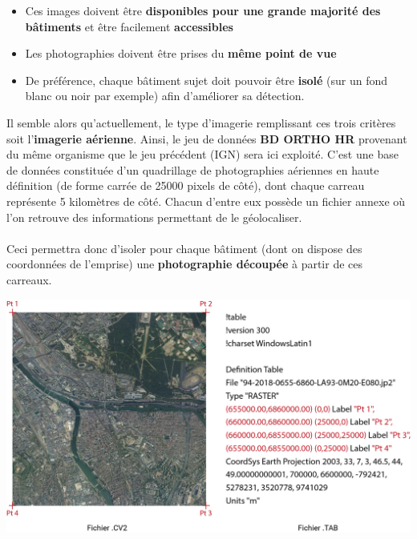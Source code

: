\documentclass[
  11pt,
  french,
]{article}
\newcounter{customfigs}[section]
\newenvironment{customfigs}[1][] {
    \stepcounter{customfigs}
    Fig \arabic{section}. \arabic{customfigs} : }
\newcommand{\masked}{\vspace*{-\baselineskip}}
\begin{document}
\begin{itemize}
\item
  Ces images doivent être \textbf{disponibles pour une grande majorité
  des bâtiments} et être facilement \textbf{accessibles}
\item
  Les photographies doivent être prises du \textbf{même point de vue}
\item
  De préférence, chaque bâtiment sujet doit pouvoir être \textbf{isolé}
  (sur un fond blanc ou noir par exemple) afin d'améliorer sa détection.
\end{itemize}

\hfill\break
Il semble alors qu'actuellement, le type d'imagerie remplissant ces
trois critères soit l'\textbf{imagerie aérienne}. Ainsi, le jeu de
données \textbf{BD ORTHO HR} provenant du même organisme que le jeu
précédent (IGN) sera ici exploité. C'est une base de données constituée
d'un quadrillage de photographies aériennes en haute définition (de
forme carrée de 25000 pixels de côté), dont chaque carreau représente 5
kilomètres de côté. Chacun d'entre eux possède un fichier annexe où l'on
retrouve des informations permettant de le géolocaliser.\\
~\\
Ceci permettra donc d'isoler pour chaque bâtiment (dont on dispose des
coordonnées de l'emprise) une \textbf{photographie découpée} à partir de
ces carreaux.

\begin{tcolorbox}[title=\begin{customfigs} Extrait d'un carreau de la BD ORTHO (gauche) et ses données de géolocalisation (droite) \end{customfigs}]

\begin{center}\includegraphics[width=1\linewidth]{__imgs/bd_ortho_tot} \end{center}

\end{tcolorbox}
\end{document}
